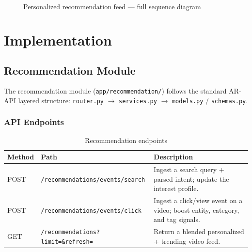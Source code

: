 \begin{figure}[H]
\caption{Personalized recommendation feed — full sequence diagram}
\label{fig:seq_rec_feed}
\end{figure}

\section{Implementation}

\subsection{Recommendation Module}

The recommendation module (\texttt{app/recommendation/}) follows the standard AR-API layered
structure: \texttt{router.py} $\rightarrow$ \texttt{services.py} $\rightarrow$
\texttt{models.py} / \texttt{schemas.py}.

\subsubsection{API Endpoints}

\begin{table}[H]
\centering
\caption{Recommendation endpoints}
\label{tab:rec_endpoints}
\begin{tabularx}{\textwidth}{llX}
\toprule
\textbf{Method} & \textbf{Path} & \textbf{Description} \\
\midrule
POST & \texttt{/recommendations/events/search} &
  Ingest a search query + parsed intent; update the interest profile. \\
POST & \texttt{/recommendations/events/click} &
  Ingest a click/view event on a video; boost entity, category, and tag signals. \\
GET  & \texttt{/recommendations?limit=\&refresh=} &
  Return a blended personalized + trending video feed. \\
\bottomrule
\end{tabularx}
\end{table}

